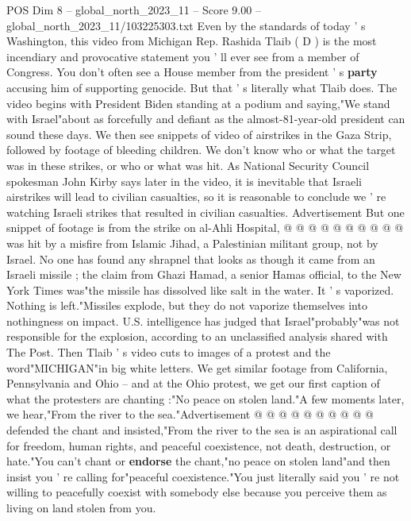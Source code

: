 \begin{textsample}{POS Dim 8 – global\_north\_2023\_11 – Score 9.00 – global\_north\_2023\_11/103225303.txt}  \label{ex:f8_pos_129}
Even by the standards of today ' s Washington, this video from Michigan Rep.
Rashida Tlaib ( D ) is the most incendiary and provocative statement you ' ll ever see from a member of Congress.
You don't often see a House member from the president ' s \textbf{party} accusing him of supporting genocide.
But that ' s literally what Tlaib does.
The video begins with President Biden standing at a podium and saying,"We stand with Israel"about as forcefully and defiant as the almost-81-year-old president can sound these days.
We then see snippets of video of airstrikes in the Gaza Strip, followed by footage of bleeding children.
We don't know who or what the target was in these strikes, or who or what was hit.
As National Security Council spokesman John Kirby says later in the video, it is inevitable that Israeli airstrikes will lead to civilian casualties, so it is reasonable to conclude we ' re watching Israeli strikes that resulted in civilian casualties.
Advertisement But one snippet of footage is from the strike on al-Ahli Hospital, @ @ @ @ @ @ @ @ @ @ was hit by a misfire from Islamic Jihad, a Palestinian militant group, not by Israel.
No one has found any shrapnel that looks as though it came from an Israeli missile ; the claim from Ghazi Hamad, a senior Hamas official, to the New York Times was"the missile has dissolved like salt in the water.
It ' s vaporized.
Nothing is left."Missiles explode, but they do not vaporize themselves into nothingness on impact.
U.S. intelligence has judged that Israel"probably"was not responsible for the explosion, according to an unclassified analysis shared with The Post.
Then Tlaib ' s video cuts to images of a protest and the word"MICHIGAN"in big white letters.
We get similar footage from California, Pennsylvania and Ohio -- and at the Ohio protest, we get our first caption of what the protesters are chanting :"No peace on stolen land."A few moments later, we hear,"From the river to the sea."Advertisement @ @ @ @ @ @ @ @ @ @ defended the chant and insisted,"From the river to the sea is an aspirational call for freedom, human rights, and peaceful coexistence, not death, destruction, or hate."You can't chant or \textbf{endorse} the chant,"no peace on stolen land"and then insist you ' re calling for"peaceful coexistence."You just literally said you ' re not willing to peacefully coexist with somebody else because you perceive them as living on land stolen from you.

\end{textsample}
